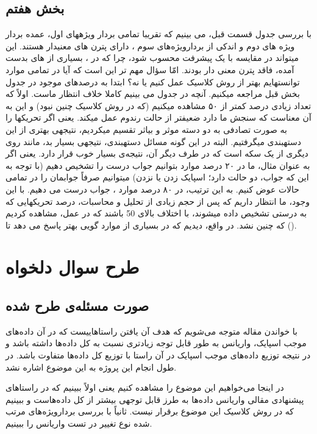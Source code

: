 \documentclass[12pt,onecolumn,a4paper,fleqn]{article}
\begin{document}
\subsection{بخش هفتم}
با بررسی جدول قسمت قبل، می بینیم که تقریبا تمامی بردار ویژههای اول، عمده بردار ویژه های دوم و اندکی از بردارویژه‌های سوم ، دارای پترن های معنیدار هستند. این میتواند در مقایسه با  یک پیشرفت محسوب شود، چرا که در  ، بسیاری از  های بدست آمده، فاقد پترن معنی دار بودند.
امّا سؤال مهم تر این است که آیا در تمامی موارد توانستهایم بهتر از روش کلاسیک عمل کنیم یا نه؟ ابتدا به درصدهای موجود در جدول بخش قبل مراجعه میکنیم. آنچه در جدول می بینیم کاملا خلاف انتظار ماست. اولاً که تعداد زیادی درصد کمتر از ۵۰ مشاهده میکنیم (که در روش کلاسیک چنین نبود) و این به آن معناست که سنجش ما دارد ضعیفتر از حالت رندوم عمل میکند. یعنی اگر تحریکها را به صورت تصادفی به دو دسته موثر و بیاثر تقسیم میکردیم، نتیجهی بهتری از این دستهبندی میگرفتیم. البته در این گونه مسائل دستهبندی، نتیجهی بسیار بد، مانند روی دیگری از یک سکه است که در طرف دیگر آن، نتیجه‌ی بسیار خوب قرار دارد. یعنی اگر به عنوان مثال، ما در ۲۰ درصد موارد بتوانیم جواب درست را تشخیص دهیم (با توجه به این که جواب، دو حالت دارد؛ اسپایک زدن یا نزدن) میتوانیم صرفاً جوابمان را در تمامی حالات عوض کنیم. به این ترتیب، در ۸۰ درصد موارد ، جواب درست می دهیم. با این وجود، ما انتظار داریم که پس از حجم زیادی از تحلیل و محاسبات، درصد تحریکهایی که به درستی تشخیص داده میشوند، با اختلاف بالای 50 باشند که در عمل، مشاهده کردیم که چنین نشد. در واقع، دیدیم که در بسیاری از موارد گویی  بهتر پاسخ می دهد تا
().

\pagebreak

\section{طرح سوال‌ دلخواه}
\subsection{صورت مسئله‌ی طرح شده}
با خواندن مقاله متوجه می‌شویم که هدف آن یافتن راستا‌هاییست که در آن داده‌های موجب اسپایک، واریانس به طور قابل‌ توجه زیادتری نسبت به کل داده‌ها داشته باشد و در نتیجه توزیع داده‌های موجب اسپایک در آن راستا با توزیع کل داده‌ها متفاوت باشد. در طول انجام این پروژه به این موضوع اشاره نشد. 

در اینجا می‌خواهیم این موضوع را مشاهده کنیم یعنی اولاً ببینیم که در راستاهای پیشنهادی مقالی واریانس داده‌ها به طرز قابل توجهی بیشتر از کل داده‌هاست و ببینیم که در روش کلاسیک  این موضوع برقرار نیست. ثانیاً با بررسی بردارویژه‌های مرتب شده نوع تغییر  در تست واریانس را ببینیم.
\end{document}
